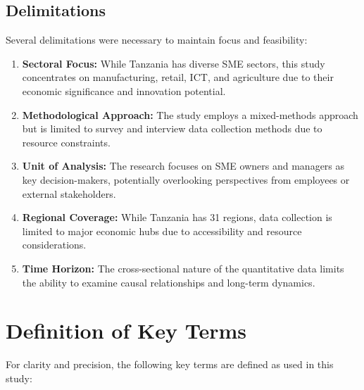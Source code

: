 \subsection{Delimitations}

Several delimitations were necessary to maintain focus and feasibility:

\begin{enumerate}
    \item \textbf{Sectoral Focus:} While Tanzania has diverse SME sectors, this study concentrates on manufacturing, retail, ICT, and agriculture due to their economic significance and innovation potential.

    \item \textbf{Methodological Approach:} The study employs a mixed-methods approach but is limited to survey and interview data collection methods due to resource constraints.

    \item \textbf{Unit of Analysis:} The research focuses on SME owners and managers as key decision-makers, potentially overlooking perspectives from employees or external stakeholders.

    \item \textbf{Regional Coverage:} While Tanzania has 31 regions, data collection is limited to major economic hubs due to accessibility and resource considerations.

    \item \textbf{Time Horizon:} The cross-sectional nature of the quantitative data limits the ability to examine causal relationships and long-term dynamics.
\end{enumerate}

\section{Definition of Key Terms}

For clarity and precision, the following key terms are defined as used in this study:

